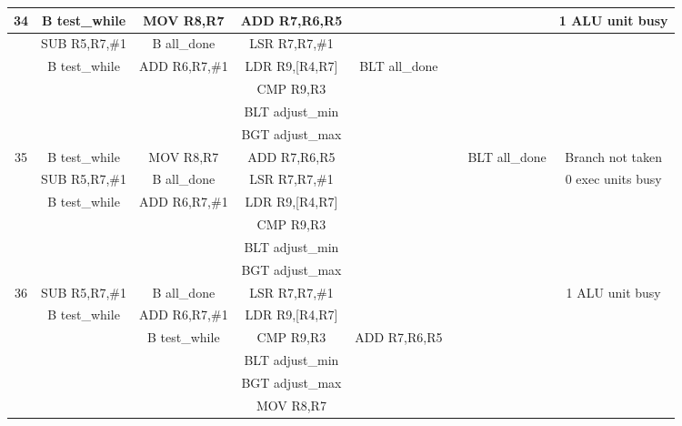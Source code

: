 \documentclass{article}
\begin{document}
{\begin{landscape}
\begin{longtable}{|c|c|c|c|c:c|c|c|}
    34 & B test\_while & MOV R8,R7 & ADD R7,R6,R5 & & & & 1 ALU unit busy \\ \hline
     & SUB R5,R7,\#1 & B all\_done & LSR R7,R7,\#1 & & & & \\ \hline
     & B test\_while & ADD R6,R7,\#1 & LDR R9,[R4,R7] & BLT all\_done &  & & \\ \hline
     &  &  & CMP R9,R3 & &  & & \\ \hline
     &  &  & BLT adjust\_min &  &  &  & \\ \hline
     &  &  & BGT adjust\_max &  &  &  & \\ \hline \hline
     
    35 & B test\_while & MOV R8,R7 & ADD R7,R6,R5 & & & BLT all\_done & Branch not taken \\ \hline
     & SUB R5,R7,\#1 & B all\_done & LSR R7,R7,\#1 & & & & 0 exec units busy \\ \hline
     & B test\_while & ADD R6,R7,\#1 & LDR R9,[R4,R7] & &  & & \\ \hline
     &  &  & CMP R9,R3 & &  & & \\ \hline
     &  &  & BLT adjust\_min &  &  &  & \\ \hline
     &  &  & BGT adjust\_max &  &  &  & \\ \hline \hline
     
    36 & SUB R5,R7,\#1 & B all\_done & LSR R7,R7,\#1 & & & & 1 ALU unit busy \\ \hline
     & B test\_while & ADD R6,R7,\#1 & LDR R9,[R4,R7] & & & & \\ \hline
     & & B test\_while & CMP R9,R3 & ADD R7,R6,R5 &  & & \\ \hline
     &  &  & BLT adjust\_min & &  & & \\ \hline
     &  &  & BGT adjust\_max &  &  &  & \\ \hline
     &  &  & MOV R8,R7 &  &  &  & \\ \hline \hline
     

\end{longtable}
\end{landscape}}
\end{document}
